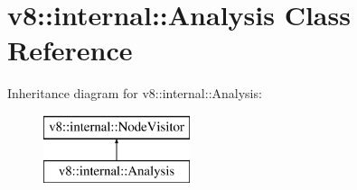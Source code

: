 \hypertarget{classv8_1_1internal_1_1_analysis}{}\section{v8\+:\+:internal\+:\+:Analysis Class Reference}
\label{classv8_1_1internal_1_1_analysis}
Inheritance diagram for v8\+:\+:internal\+:\+:Analysis\+:\begin{figure}[H]
\begin{center}
\leavevmode
\includegraphics[height=2.000000cm]{classv8_1_1internal_1_1_analysis}
\end{center}
\end{figure}
